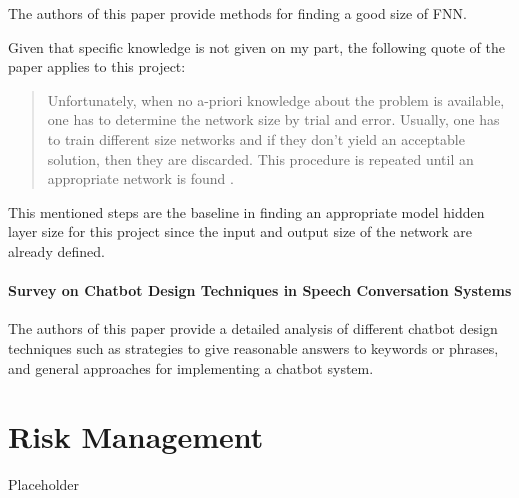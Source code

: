             The authors of this paper provide methods for finding a good size of FNN.

            Given that specific knowledge is not given on my part, the following quote of the paper applies to this project:

            \begin{quote}
                Unfortunately, when no a-priori knowledge about the problem is available, one has to determine the network size by trial and error.
                Usually, one has to train different size networks and if they don't yield an acceptable solution, then they are discarded. 
                This procedure is repeated until an appropriate network is found \cite[Why are small and simple networks better?]{feedforwardsize}.
            \end{quote}
            This mentioned steps are the baseline in finding an appropriate model hidden layer size for this project since the input and output size of the network are already defined.


        \paragraph{Survey on Chatbot Design Techniques in Speech Conversation Systems \cite{abdul2015survey}}
        \label{par:chatbot-survey}

            The authors of this paper provide a detailed analysis of different chatbot design techniques such as strategies to give reasonable answers to keywords or phrases, and general approaches for implementing a chatbot system.
 
        



\section{Risk Management}
\label{sec:risk-management}
    Placeholder




\pagebreak





